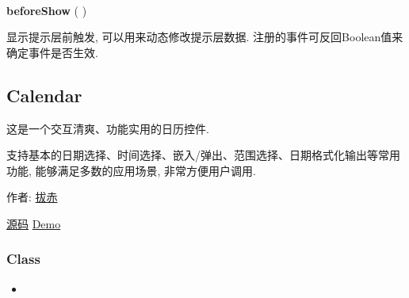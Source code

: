 \documentclass[letterpaper,10pt,english]{sphinxmanual}
\begin{document}

\begin{fulllineitems}
\label{api/component/suggest/index:Suggest.beforeShow}~
\begin{DUlineblock}{0em}
\item[] \textbf{beforeShow} ( )
\item[] 显示提示层前触发, 可以用来动态修改提示层数据. 注册的事件可反回Boolean值来确定事件是否生效.
\end{DUlineblock}

\end{fulllineitems}

\label{api/component/calendar/index:module-Calendar}

\subsection{Calendar}
\label{api/component/calendar/index:calendar}\label{api/component/calendar/index::doc}
\begin{DUlineblock}{0em}
\item[] 这是一个交互清爽、功能实用的日历控件.
\item[] 支持基本的日期选择、时间选择、嵌入/弹出、范围选择、日期格式化输出等常用功能, 能够满足多数的应用场景, 非常方便用户调用.
\item[] 作者: \href{mailto:bachi@taobao.com}{拔赤}
\item[] \href{https://github.com/kissyteam/kissy/tree/master/src/calendar}{源码}  \textbar{} \href{http://kissyteam.github.com/kissy/src/calendar/demo.html}{Demo}
\end{DUlineblock}


\subsubsection{Class}
\label{api/component/calendar/index:class}\begin{itemize}
\item {}
{\hyperref[api/component/calendar/index:Calendar.Calendar]{}}

\end{itemize}
\end{document}
